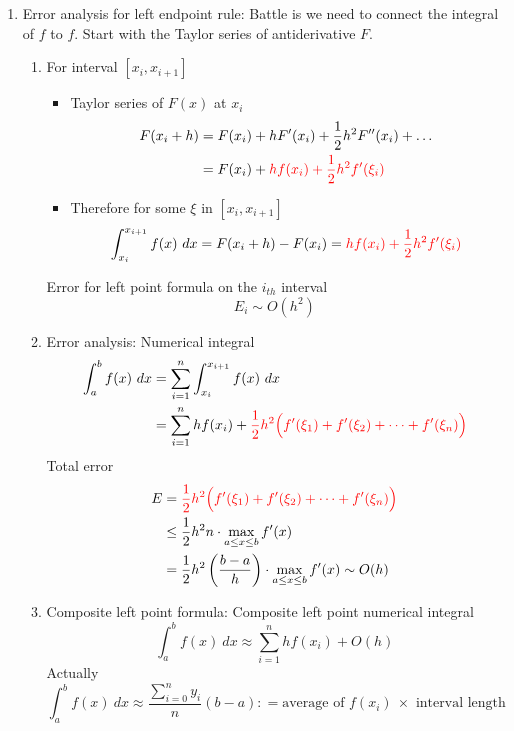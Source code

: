 \documentclass{article}
\theoremstyle{remark}
\begin{document}
\begin{enumerate}
\begin{enumerate}
\item Error analysis for left endpoint rule: Battle is we need to connect the integral of $f$ to $f$. Start with the Taylor series of antiderivative $F$.
\begin{enumerate}
\item For interval $[x_i,x_{i+1}]$
\begin{itemize}
\item  Taylor series of $F(x)$ at $x_i$
\begin{equation*}
\begin{split}
F(x_i+h) & = F(x_i) +hF'(x_i) + \frac{1}{2}h^2F''(x_i)+\dots\\
& = F(x_i) + {\color{red} hf(x_i)+ \frac{1}{2}h^2f'(\xi_i)}
\end{split}
\end{equation*}
\item Therefore for some $\xi$ in $[x_i,x_{i+1}]$
$$
\int_{x_{i}}^{x_{i+1}}f(x)~dx = F(x_{i}+h)-F(x_i) =  {\color{red} hf(x_i)+ \frac{1}{2}h^2f'(\xi_i)}
$$
\end{itemize}
Error for left point formula on the $i_{th}$ interval
$$
E_i \sim O(h^2)
$$

\item Error analysis: Numerical integral
\begin{equation*}
\begin{split}
\int_a^b f(x)~dx & = \sum_{i=1}^n \int_{x_{i}}^{x_{i+1}}f(x)~dx\\
 & = \sum_{i=1}^n hf(x_i) +{\color{red}\frac{1}{2}h^2\Big(f'(\xi_1) + f'(\xi_2) + \dots + f'(\xi_n)\Big)}
\end{split}
\end{equation*}
Total error
\begin{equation*}
\begin{split}
E & = {\color{red}\frac{1}{2}h^2\Big(f'(\xi_1) + f'(\xi_2) + \dots + f'(\xi_n)\Big)}\\
& \leq \frac{1}{2}h^2n\cdot \max_{a\leq x\leq b} f'(x) \\
& = \frac{1}{2}h^2 \left(\frac{b-a}{h} \right)\cdot \max_{a\leq x\leq b} f'(x) 
\sim O(h)
\end{split}
\end{equation*}

\item Composite left point formula: Composite left point numerical integral
$$
\int_a^b f(x)~dx \approx \sum_{i=1}^n hf(x_i)+O(h)
$$
Actually
$$
\int_a^b f(x)~dx \approx \frac{\sum_{i=0}^ny_i}{n}(b-a) : = \text{average of $f(x_i)~\times$ interval length }
$$
\end{enumerate}



\end{enumerate}
\end{enumerate}
\end{document}
